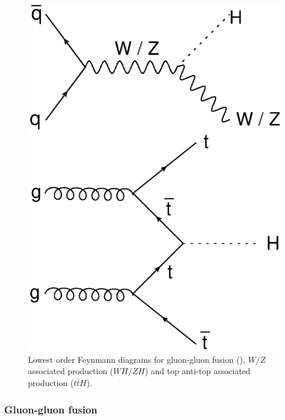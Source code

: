 			\begin{figure}[h]
				\centering
					\begin{minipage}[h]{0.4\linewidth}
						\includegraphics[width=1\linewidth]{T/FIGS/whzh}
					\end{minipage}
					\quad\quad
					\begin{minipage}[h]{0.4\linewidth}
						\includegraphics[width=1\linewidth]{T/FIGS/tth}
					\end{minipage}
				\caption{Lowest order Feynmann diagrams for gluon-gluon fusion (\ggF), $W/Z$ associated production ($WH/ZH$) and top anti-top associated production ($t\bar{t}H$).}
				\label{fig:higgsproddiag}
			\end{figure}


		\subsubsection{Gluon-gluon fusion}

